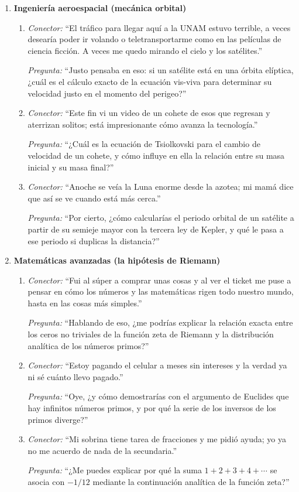 \begin{enumerate}[label=\textbf{Tema \arabic*.}, wide=0pt, leftmargin=0pt, itemsep=0.6em]
  \item \textbf{Ingeniería aeroespacial (mecánica orbital)}
  \begin{enumerate}[label=\alph*), leftmargin=1.8em, itemsep=0.3em]
    \item \textit{Conector:} \enquote{El tráfico para llegar aquí a la UNAM estuvo terrible, a veces desearía poder ir volando o teletransportarme como en las películas de ciencia ficción. A veces me quedo mirando el cielo y los satélites.}\par
    \textit{Pregunta:} \enquote{Justo pensaba en eso: si un satélite está en una órbita elíptica, ¿cuál es el cálculo exacto de la ecuación vis-viva para determinar su velocidad justo en el momento del perigeo?}
    \item \textit{Conector:} \enquote{Este fin vi un video de un cohete de esos que regresan y aterrizan solitos; está impresionante cómo avanza la tecnología.}\par
    \textit{Pregunta:} \enquote{¿Cuál es la ecuación de Tsiolkovski para el cambio de velocidad de un cohete, y cómo influye en ella la relación entre su masa inicial y su masa final?}
    \item \textit{Conector:} \enquote{Anoche se veía la Luna enorme desde la azotea; mi mamá dice que así se ve cuando está más cerca.}\par
    \textit{Pregunta:} \enquote{Por cierto, ¿cómo calcularías el periodo orbital de un satélite a partir de su semieje mayor con la tercera ley de Kepler, y qué le pasa a ese periodo si duplicas la distancia?}
  \end{enumerate}

  \item \textbf{Matemáticas avanzadas (la hipótesis de Riemann)}
  \begin{enumerate}[label=\alph*), leftmargin=1.8em, itemsep=0.3em]
    \item \textit{Conector:} \enquote{Fui al súper a comprar unas cosas y al ver el ticket me puse a pensar en cómo los números y las matemáticas rigen todo nuestro mundo, hasta en las cosas más simples.}\par
    \textit{Pregunta:} \enquote{Hablando de eso, ¿me podrías explicar la relación exacta entre los ceros no triviales de la función zeta de Riemann y la distribución analítica de los números primos?}
    \item \textit{Conector:} \enquote{Estoy pagando el celular a meses sin intereses y la verdad ya ni sé cuánto llevo pagado.}\par
    \textit{Pregunta:} \enquote{Oye, ¿y cómo demostrarías con el argumento de Euclides que hay infinitos números primos, y por qué la serie de los inversos de los primos diverge?}
    \item \textit{Conector:} \enquote{Mi sobrina tiene tarea de fracciones y me pidió ayuda; yo ya no me acuerdo de nada de la secundaria.}\par
    \textit{Pregunta:} \enquote{¿Me puedes explicar por qué la suma $1 + 2 + 3 + 4 + \cdots$ se asocia con $-1/12$ mediante la continuación analítica de la función zeta?}
  \end{enumerate}


\end{enumerate}
